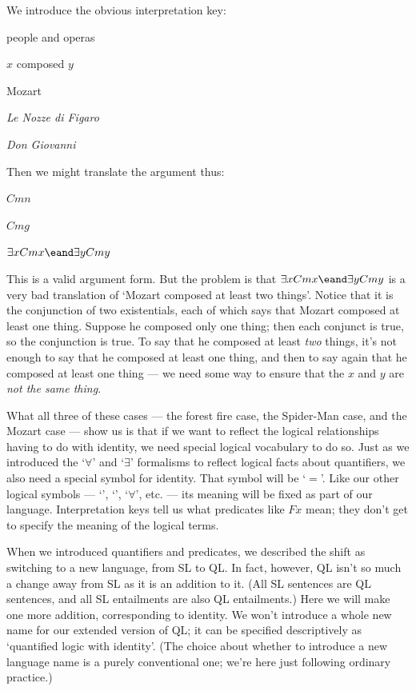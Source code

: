 We introduce the obvious interpretation key:

\begin{ekey}
\item[UD:] people and operas
\item[Cxy:] $x$ composed $y$
\item[m:] Mozart
\item[n:] \emph{Le Nozze di Figaro}
\item[g:] \emph{Don Giovanni}
\end{ekey}

Then we might translate the argument thus:

\begin{earg}
\item[] $Cmn$
\item[] $Cmg$
\item[\therefore] $\exists x Cmx \eand \exists y Cmy$
\end{earg}

This is a valid argument form. But the problem is that $\exists x Cmx \eand \exists y Cmy$ is a very bad translation of `Mozart composed at least two things'. Notice that it is the conjunction of two existentials, each of which says that Mozart composed at least one thing. Suppose he composed only one thing; then each conjunct is true, so the conjunction is true. To say that he composed at least \emph{two} things, it's not enough to say that he composed at least one thing, and then to say again that he composed at least one thing --- we need some way to ensure that the $x$ and $y$ are \emph{not the same thing}.

What all three of these cases --- the forest fire case, the Spider-Man case, and the Mozart case --- show us is that if we want to reflect the logical relationships having to do with identity, we need special logical vocabulary to do so. Just as we introduced the `$\forall$' and `$\exists$' formalisms to reflect logical facts about quantifiers, we also need a special symbol for identity. That symbol will be `$=$'. Like our other logical symbols --- `\eif', `\enot', `$\forall$', etc. --- its meaning will be fixed as part of our language. Interpretation keys tell us what predicates like $Fx$ mean; they don't get to specify the meaning of the logical terms.

When we introduced quantifiers and predicates, we described the shift as switching to a new language, from SL to QL. In fact, however, QL isn't so much a change away from SL as it is an addition to it. (All SL sentences are QL sentences, and all SL entailments are also QL entailments.) Here we will make one more addition, corresponding to identity. We won't introduce a whole new name for our extended version of QL; it can be specified descriptively as `quantified logic with identity'. (The choice about whether to introduce a new language name is a purely conventional one; we're here just following ordinary practice.)

